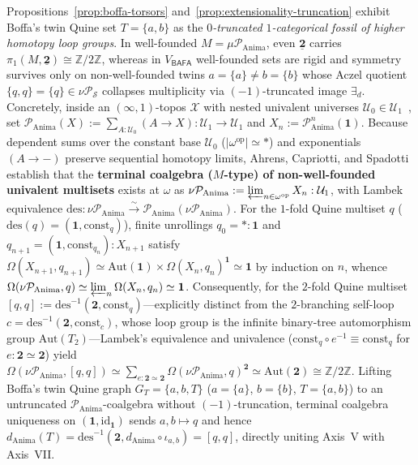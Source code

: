 \begin{remark}\label{rem:nu-anima-fossil}%
%
Propositions~\ref{prop:boffa-torsors} and~\ref{prop:extensionality-truncation} exhibit Boffa's twin Quine set $T = \{a, b\}$ as the \emph{$0$-truncated $1$-categorical fossil of higher homotopy loop groups}. In well-founded $M = \mu \mathcal{P}_{\mathrm{Anima}}$, even $\underline{\mathbf{2}}$ carries $\pi_1(M, \underline{\mathbf{2}}) \cong \mathbb{Z}/2\mathbb{Z}$, whereas in $V_{\mathsf{BAFA}}$ well-founded sets are rigid and symmetry survives only on non-well-founded twins $a = \{a\} \neq b = \{b\}$ whose Aczel quotient $\{q, q\} = \{q\} \in \nu \mathcal{P}_{\mathcal{S}}$ collapses multiplicity via $(-1)$-truncated image $\exists_d$. Concretely, inside an $(\infty, 1)$-topos $\mathcal{X}$ with nested univalent universes $\mathcal{U}_0 \in \mathcal{U}_1$~\cite[\S 6.1.6]{Lurie09}, set $\mathcal{P}_{\mathrm{Anima}}(X) := \sum_{A : \mathcal{U}_0} (A \to X) : \mathcal{U}_1 \to \mathcal{U}_1$ and $X_n := \mathcal{P}_{\mathrm{Anima}}^n(\mathbf{1})$. Because dependent sums over the constant base $\mathcal{U}_0$ ($|\omega^{\mathrm{op}}| \simeq *$) and exponentials $(A \to -)$ preserve sequential homotopy limits, Ahrens, Capriotti, and Spadotti~\cite{AhrensCapriottiSpadotti15} establish that the \textbf{terminal coalgebra ($M$-type) of non-well-founded univalent multisets} exists at $\omega$ as $\nu \mathcal{P}_{\mathrm{Anima}} := \varprojlim_{n \in \omega^{\mathrm{op}}} X_n : \mathcal{U}_1$, with Lambek equivalence $\mathrm{des} : \nu \mathcal{P}_{\mathrm{Anima}} \xrightarrow{\sim} \mathcal{P}_{\mathrm{Anima}}(\nu \mathcal{P}_{\mathrm{Anima}})$. For the $1$-fold Quine multiset $q$ ($\mathrm{des}(q) = (\mathbf{1}, \mathrm{const}_q)$), finite unrollings $q_0 = * : \mathbf{1}$ and $q_{n+1} = (\mathbf{1}, \mathrm{const}_{q_n}) : X_{n+1}$ satisfy $\Omega(X_{n+1}, q_{n+1}) \simeq \mathrm{Aut}(\mathbf{1}) \times \Omega(X_n, q_n)^{\mathbf{1}} \simeq \mathbf{1}$ by induction on $n$, whence $\Omega(\nu \mathcal{P}_{\mathrm{Anima}}, q) \simeq \varprojlim_n \Omega(X_n, q_n) \simeq \mathbf{1}$. Consequently, for the $2$-fold Quine multiset $[q, q] := \mathrm{des}^{-1}(\mathbf{2}, \mathrm{const}_q)$---explicitly distinct from the $2$-branching self-loop $c = \mathrm{des}^{-1}(\mathbf{2}, \mathrm{const}_c)$, whose loop group is the infinite binary-tree automorphism group $\mathrm{Aut}(T_2)$---Lambek's equivalence and univalence ($\mathrm{const}_q \circ e^{-1} \equiv \mathrm{const}_q$ for $e : \mathbf{2} \simeq \mathbf{2}$) yield $\Omega(\nu \mathcal{P}_{\mathrm{Anima}}, [q, q]) \simeq \sum_{e : \mathbf{2} \simeq \mathbf{2}} \Omega(\nu \mathcal{P}_{\mathrm{Anima}}, q)^{\mathbf{2}} \simeq \mathrm{Aut}(\mathbf{2}) \cong \mathbb{Z}/2\mathbb{Z}$. Lifting Boffa's twin Quine graph $G_T = \{a, b, T\}$ ($a = \{a\}$, $b = \{b\}$, $T = \{a, b\}$) to an untruncated $\mathcal{P}_{\mathrm{Anima}}$-coalgebra without $(-1)$-truncation, terminal coalgebra uniqueness on $(\mathbf{1}, \mathrm{id}_{\mathbf{1}})$ sends $a, b \mapsto q$ and hence $d_{\mathrm{Anima}}(T) = \mathrm{des}^{-1}(\mathbf{2}, d_{\mathrm{Anima}} \circ \iota_{a,b}) = [q, q]$, directly uniting Axis~V with Axis~VII.

\end{remark}
